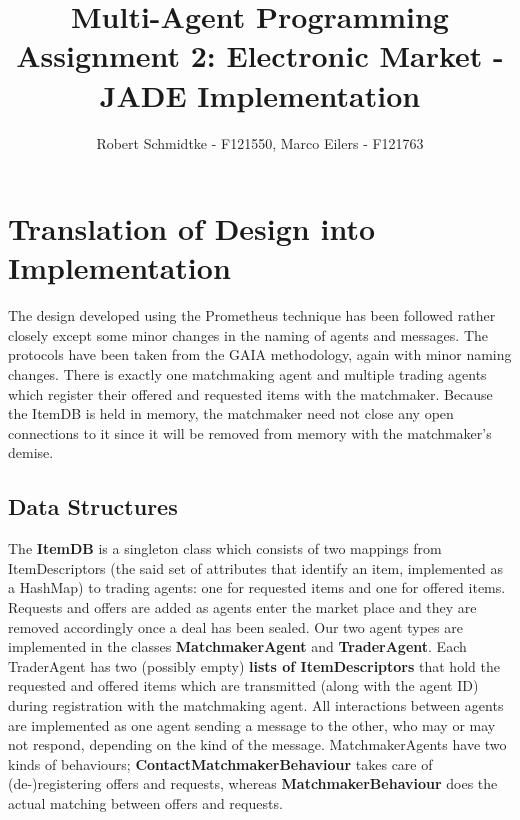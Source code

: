 \documentclass[a4paper,11pt]{article}
\begin{document}
\title{Multi-Agent Programming\\Assignment 2: Electronic Market - JADE Implementation}
\author{Robert Schmidtke - F121550, Marco Eilers - F121763}

\maketitle
\newpage

\section{Translation of Design into Implementation}
The design developed using the Prometheus technique has been followed rather closely except some minor changes in the naming of agents and messages. The protocols have been taken from the GAIA methodology, again with minor naming changes. There is exactly one matchmaking agent and multiple trading agents which register their offered and requested items with the matchmaker. Because the ItemDB is held in memory, the matchmaker need not close any open connections to it since it will be removed from memory with the matchmaker's demise.

\subsection{Data Structures}
The \textbf{ItemDB} is a singleton class which consists of two mappings from ItemDescriptors (the said set of attributes that identify an item, implemented as a HashMap) to trading agents: one for requested items and one for offered items. Requests and offers are added as agents enter the market place and they are removed accordingly once a deal has been sealed. Our two agent types are implemented in the classes \textbf{MatchmakerAgent} and \textbf{TraderAgent}. Each TraderAgent has two (possibly empty) \textbf{lists of ItemDescriptors} that hold the requested and offered items which are transmitted (along with the agent ID) during registration with the matchmaking agent. All interactions between agents are implemented as one agent sending a message to the other, who may or may not respond, depending on the kind of the message. MatchmakerAgents have two kinds of behaviours; \textbf{ContactMatchmakerBehaviour} takes care of (de-)registering offers and requests, whereas \textbf{MatchmakerBehaviour} does the actual matching between offers and requests.
\end{document}
